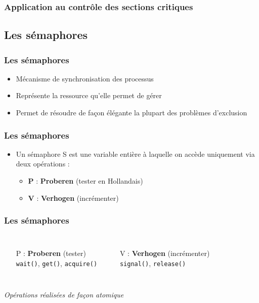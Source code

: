 \begin{frame}
\frametitle{Application au contrôle des sections critiques}
\begin{scriptsize}\end{scriptsize}
\end{frame}





\subsection{Les sémaphores}

\begin{frame}
\frametitle{Les sémaphores}
\begin{itemize}
\item Mécanisme de synchronisation des processus
\item Représente la ressource qu’elle permet de gérer
\item Permet de résoudre de façon élégante la plupart des problèmes d’exclusion
\end{itemize}
\end{frame}

\begin{frame}
\frametitle{Les sémaphores}
\begin{itemize}
\item Un sémaphore S est une variable entière à laquelle on accède uniquement via deux opérations :
\begin{itemize}
\item \textbf{P} : \textbf{Proberen} (tester en Hollandais)
\item \textbf{V} : \textbf{Verhogen} (incrémenter)
\end{itemize}
\end{itemize}
\end{frame}

\begin{frame}
\frametitle{Les sémaphores}
\begin{columns}
\begin{itemize}
\item[P] : \textbf{Proberen} (tester)\\ \texttt{wait()}, \texttt{get()}, \texttt{acquire()}
\end{itemize}

\begin{itemize}
\item[V] : \textbf{Verhogen} (incrémenter)\\ \texttt{signal()}, \texttt{release()}
\end{itemize}

\end{columns}
\begin{block}{}
\begin{center}
\textit{Opérations réalisées de façon atomique}
\end{center}
\end{block}
\end{frame}


